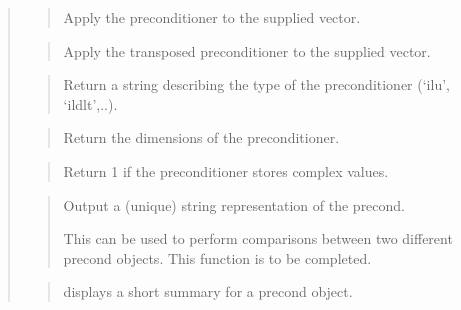 \documentclass[a4paper,11pt,english]{sphinxmanual}
\begin{document}
\begin{quote}

\begin{quote}

Apply the preconditioner to the supplied vector.
\end{quote}

\begin{quote}

Apply the transposed preconditioner to the supplied vector.
\end{quote}

\begin{quote}

Return a string describing the type of the preconditioner (‘ilu’, ‘ildlt’,..).
\end{quote}

\begin{quote}

Return the dimensions of the preconditioner.
\end{quote}

\begin{quote}

Return 1 if the preconditioner stores complex values.
\end{quote}

\begin{quote}

Output a (unique) string representation of the precond.

This can be used to perform comparisons between two
different precond objects.
This function is to be completed.
\end{quote}

\begin{quote}

displays a short summary for a precond object.
\end{quote}
\end{quote}
\end{document}

